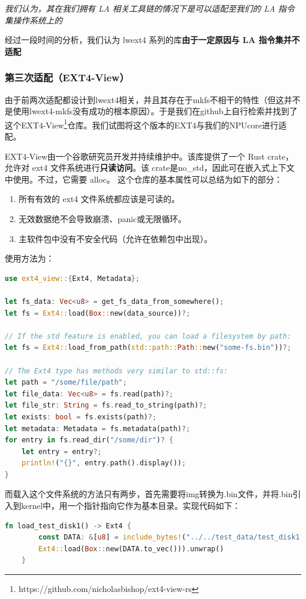 \textit{我们认为，其在我们拥有 LA 相关工具链的情况下是可以适配至我们的 LA 指令集操作系统上的}

经过一段时间的分析，我们认为 lwext4 系列的库\textbf{由于一定原因与 LA 指令集并不适配}

\subsubsection{第三次适配（EXT4-View）}

由于前两次适配都设计到lwext4相关，并且其存在于mkfs不相干的特性（但这并不是使用lwext4-mkfs没有成功的根本原因）。于是我们在github上自行检索并找到了这个EXT4-View\footnote{https://github.com/nicholasbishop/ext4-view-rs}仓库。我们试图将这个版本的EXT4与我们的NPUcore进行适配。

EXT4-View由一个谷歌研究员开发并持续维护中。该库提供了一个 Rust crate，允许对 ext4 文件系统进行\textbf{只读访问}。该 crate是no_std，因此可在嵌入式上下文中使用。不过，它需要 alloc。
这个仓库的基本属性可以总结为如下的部分：
\begin{enumerate}
    \item 所有有效的 ext4 文件系统都应该是可读的。
    \item 无效数据绝不会导致崩溃、panic或无限循环。
    \item 主软件包中没有不安全代码（允许在依赖包中出现）。
\end{enumerate}
使用方法为：
\begin{lstlisting}[language={Rust}, caption={ext4-view在kernel中的基本使用方法示例}]
use ext4_view::{Ext4, Metadata};

let fs_data: Vec<u8> = get_fs_data_from_somewhere();
let fs = Ext4::load(Box::new(data_source))?;

// If the std feature is enabled, you can load a filesystem by path:
let fs = Ext4::load_from_path(std::path::Path::new("some-fs.bin"))?;

// The Ext4 type has methods very similar to std::fs:
let path = "/some/file/path";
let file_data: Vec<u8> = fs.read(path)?;
let file_str: String = fs.read_to_string(path)?;
let exists: bool = fs.exists(path)?;
let metadata: Metadata = fs.metadata(path)?;
for entry in fs.read_dir("/some/dir")? {
    let entry = entry?;
    println!("{}", entry.path().display());
}
    \end{lstlisting}

而载入这个文件系统的方法只有两步，首先需要将img转换为.bin文件，并将.bin引入到kernel中，用一个指针指向它作为基本目录。实现代码如下：
\begin{lstlisting}[language={Rust}, caption={将测例加载进入kernel}]
    fn load_test_disk1() -> Ext4 {
        const DATA: &[u8] = include_bytes!("../../test_data/test_disk1.bin");
        Ext4::load(Box::new(DATA.to_vec())).unwrap()
    }

\end{lstlisting}

